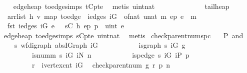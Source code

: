 \begin{isabellebody}
%
\isadelimproof
\ \ %
\endisadelimproof
%
\isatagproof
{}\isamarkupfalse%
\ edge{\isacharunderscore}heap\ to{\isacharunderscore}edge{\isachardot}simps\ t{\isacharunderscore}C{\isacharunderscore}pte\ \isamarkupfalse%
\ {\isacharparenleft}metis\ uint{\isacharunderscore}nat{\isacharparenright}%
\endisatagproof
{\isafoldproof}%
%
\isadelimproof
\ \ \ \ \ \ \ \ \ \ \ \ \isanewline
%
\endisadelimproof
\isanewline
{}\isamarkupfalse%
\ tail{\isacharunderscore}heap{\isacharcolon}\isanewline
\ \ {\isachardoublequoteopen}{\isasymlbrakk}arrlist\ h\ v\ {\isacharparenleft}map\ {\isacharparenleft}to{\isacharunderscore}edge\ {\isasymcirc}\ {\isacharparenleft}iedges\ iG\ {\isasymcirc}\ of{\isacharunderscore}nat{\isacharparenright}{\isacharparenright}\ {\isacharbrackleft}{}{\isachardot}{\isachardot}{\isacharless}unat\ m{\isacharbrackright}{\isacharparenright}\ ep{\isacharsemicolon}\ e\ {\isacharless}\ m{\isasymrbrakk}\ {\isasymLongrightarrow}\isanewline
\ \ fst\ {\isacharparenleft}{\isacharparenleft}iedges\ iG{\isacharparenright}\ e{\isacharparenright}\ {\isacharequal}\ \ s{\isacharunderscore}C\ {\isacharparenleft}h\ {\isacharparenleft}ep\ {\isacharplus}\isactrlsub p\ \ {\isacharparenleft}uint\ e{\isacharparenright}{\isacharparenright}{\isacharparenright}{\isachardoublequoteclose}\ \isanewline
%
\isadelimproof
\ \ %
\endisadelimproof
%
\isatagproof
{}\isamarkupfalse%
\ edge{\isacharunderscore}heap\ to{\isacharunderscore}edge{\isachardot}simps\ s{\isacharunderscore}C{\isacharunderscore}pte\ uint{\isacharunderscore}nat\ \isamarkupfalse%
\ metis%
\endisatagproof
{\isafoldproof}%
%
\isadelimproof
\isanewline
%
\endisadelimproof
\isanewline
\isanewline
{}\isamarkupfalse%
\ check{\isacharunderscore}parent{\isacharunderscore}num{\isacharunderscore}spc{\isacharprime}{\isacharcolon}\isanewline
\ \ {\isachardoublequoteopen}{\isasymlbrace}\ P\ and\ \isanewline
\ \ \ \ {\isacharparenleft}{\isasymlambda}s{\isachardot}\ wf{\isacharunderscore}digraph\ {\isacharparenleft}abs{\isacharunderscore}IGraph\ iG{\isacharparenright}\ {\isasymand}\ \isanewline
\ \ \ \ \ \ \ \ \ is{\isacharunderscore}graph\ s\ iG\ g\ {\isasymand}\ \isanewline
\ \ \ \ \ \ \ \ \ is{\isacharunderscore}numm\ s\ iG\ iN\ n\ {\isasymand}\ \isanewline
\ \ \ \ \ \ \ \ \ is{\isacharunderscore}pedge\ s\ iG\ iP\ p\ {\isasymand}\ \isanewline
\ \ \ \ \ \ \ \ \ r\ {\isacharless}\ ivertex{\isacharunderscore}cnt\ iG{\isacharparenright}{\isasymrbrace}\isanewline
\ \ check{\isacharunderscore}parent{\isacharunderscore}num{\isacharprime}\ g\ r\ p\ n\ \isanewline

\end{isabellebody}
